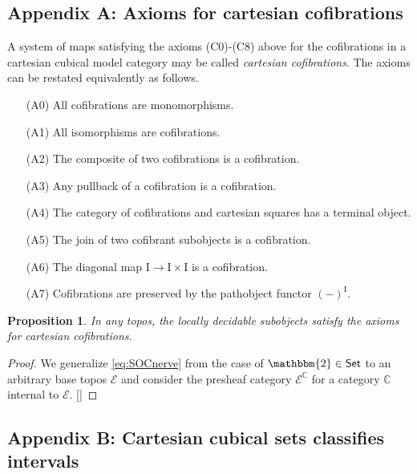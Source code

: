 \documentclass[11pt]{amsart}
\newcommand{\ednote}[1]{[\textit{\color{red}{#1}}]} %
\newcommand{\bbC}{\ensuremath{\mathbb{C}}}
\newcommand{\EE}{\ensuremath{\mathcal{E}}}
\newcommand{\Set}{\ensuremath{\mathsf{Set}}}
\newcommand{\ra}{\ensuremath{\rightarrow}}
\renewcommand{\to}{\ensuremath{\rightarrow}}
\newcommand{\I}{\ensuremath{\mathrm{I}}}
\newtheorem{proposition}[theorem]{Proposition}
\theoremstyle{remark}
\theoremstyle{definition}
\begin{document}
\subsection*{Appendix A: Axioms for cartesian cofibrations}\label{appendix:Cofibrations}

A system of maps satisfying the axioms (C0)-(C8) above for the cofibrations in a cartesian cubical model category may be called \emph{cartesian cofibrations}. The axioms can be restated equivalently as follows.
\begin{enumerate}
\item[(A0)] All cofibrations are monomorphisms.
\item[(A1)] All isomorphisms are cofibrations.
\item[(A2)] The composite of two cofibrations is a cofibration.
\item[(A3)] Any pullback of a cofibration is a cofibration.
\item[(A4)] The category of cofibrations and cartesian squares has a terminal object.
\item[(A5)] The join of two cofibrant subobjects is a cofibration.
\item[(A6)] The diagonal map $\I\ra\I\times\I$ is a cofibration.
\item[(A7)] Cofibrations are preserved by the pathobject functor $(-)^\I$.
\end{enumerate}

\begin{proposition}
 In any topos, the locally decidable subobjects satisfy the axioms for cartesian cofibrations.
\end{proposition}
\begin{proof}

We generalize \eqref{eq:SOCnerve} from the case of $\mathbbm{2}\in\Set$ to an arbitrary base topos $\EE$ and consider the presheaf category $\EE^{\bbC}$ for a category $\bbC$ internal to $\EE$. \ednote{fill in!}
\end{proof}
%

\subsection*{Appendix B: Cartesian cubical sets classifies intervals}\label{appendix:classtopos}
\end{document}
